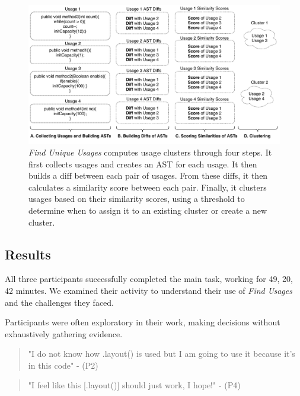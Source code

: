 \documentclass[conference]{IEEEtran}
\begin{document}
\begin{figure}
    \centering
    \includegraphics [width=\textwidth,keepaspectratio,clip]{figures/GeneralView2.pdf}
    \caption{\textit{Find Unique Usages} computes usage clusters through four steps. It first collects usages and creates an AST for each usage. It then builds a diff between each pair of usages. From these diffs, it then calculates a similarity score between each pair. Finally, it clusters usages based on their similarity scores, using a threshold to determine when to assign it to an existing cluster or create a new cluster.}
\label{fig:generalview}
\end{figure}

\subsection{Results}

All three participants successfully completed the main task, working for 49, 20, 42 minutes. We examined their activity to understand their use of \textit{Find Usages} and the challenges they faced. 

Participants were often exploratory in their work, making decisions without exhaustively gathering evidence. 
\begin{quote}"I do not know how .layout() is used but I am going to use it because it's in this code" - (P2) \end{quote}
\begin{quote}"I feel like this [.layout()] should just work, I hope!" - (P4) \end{quote}
\end{document}
